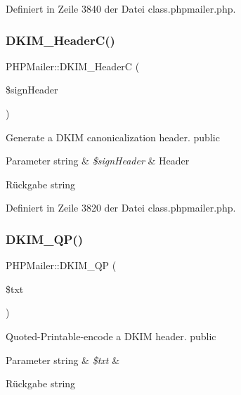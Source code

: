 Definiert in Zeile 3840 der Datei class.\+phpmailer.\+php.

\mbox{\label{class_p_h_p_mailer_a1e62388dd7fe1e63baf24a219a860e7a}} 
\subsubsection{\texorpdfstring{D\+K\+I\+M\+\_\+\+Header\+C()}{DKIM\_HeaderC()}}
{\footnotesize\ttfamily P\+H\+P\+Mailer\+::\+D\+K\+I\+M\+\_\+\+HeaderC (\begin{DoxyParamCaption}\item[{}]{\$sign\+Header }\end{DoxyParamCaption})}

Generate a D\+K\+IM canonicalization header.  public 
\begin{DoxyParams}[1]{Parameter}
string & {\em \$sign\+Header} & Header \\
\hline
\end{DoxyParams}
\begin{DoxyReturn}{Rückgabe}
string 
\end{DoxyReturn}


Definiert in Zeile 3820 der Datei class.\+phpmailer.\+php.

\mbox{\label{class_p_h_p_mailer_aa3359069634a324db4db430e2a5236d3}} 
\subsubsection{\texorpdfstring{D\+K\+I\+M\+\_\+\+Q\+P()}{DKIM\_QP()}}
{\footnotesize\ttfamily P\+H\+P\+Mailer\+::\+D\+K\+I\+M\+\_\+\+QP (\begin{DoxyParamCaption}\item[{}]{\$txt }\end{DoxyParamCaption})}

Quoted-\/\+Printable-\/encode a D\+K\+IM header.  public 
\begin{DoxyParams}[1]{Parameter}
string & {\em \$txt} & \\
\hline
\end{DoxyParams}
\begin{DoxyReturn}{Rückgabe}
string 
\end{DoxyReturn}


